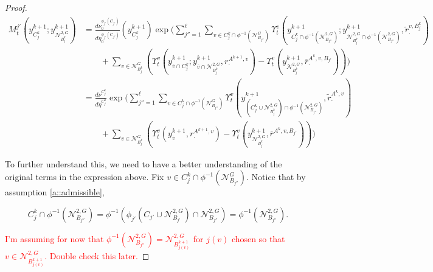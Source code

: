 \documentclass[12pt]{article}
\newcommand{\mc}{\mathcal}
\newcommand{\ov}{\overline}
\newcommand{\tr}{\textcolor{red}}
\newcommand{\gneigh}[2]{\mc{N}^{#1}_{#2}}			%
\newcommand{\dgneigh}[2]{\mc{N}^{2,#1}_{#2}}		%
\newcommand{\cl}[1]{\ov{#1}}						%
\newcommand{\indx}[1]{^{#1}}						%
\newcommand{\rate}{r}								%
\newcommand{\xg}{y}									%
\newcommand{\vind}[1]{_{#1}}						%
\newcommand{\vpara}[1]{^{#1}}						%
\newcommand{\stpara}[1]{_{#1}}						%
\newcommand{\tpara}[1]{_{#1}}						%
\newcommand{\gvpara}[2]{^{#1,#2}}					%
\newcommand{\psize}{\ell}							%
\newcommand{\brate}{\alt{\rate}}					%
\newcommand{\alt}[1]{\tilde{#1}}					%
\newcommand{\mm}{\nu}								%
\newcommand{\bgrate}{\ov{\rate}}					%
\newcommand{\mmm}{\eta}								%
\newcommand{\ds}{\Upsilon}							%
\newcommand{\mdense}{M}								%
\newcommand{\gvjpara}[3]{^{#1,#2,#3}}				%
\newcommand{\jpara}[1]{^{#1}}						%
\newcommand{\vjpara}[2]{^{#1,#2}}					%
\begin{document}
\begin{proof}
\begin{align*}
\mdense\jpara{j'}\tpara{t}\left(\xg\indx{k+1}\vind{C_j\indx{k}};\xg\indx{k+1}\vind{\dgneigh{G}{B\indx{k}_j}}\right) &= \frac{d\mm\vpara{\phi_{j'}(C_{j'})}\tpara{0}}{d\mmm\vpara{\phi_{j'}(C_{j'})}\tpara{0}}(\xg\indx{k+1}\vind{C\indx{k}_j})\exp\Bigg(\sum_{j'' = 1}^{\psize}\sum_{v \in C_j\indx{k}\cap\phi^{-1}(\gneigh{G}{B_{j''}})} \ds\vpara{v}\tpara{t}\left(\xg\indx{k+1}\vind{C_j\indx{k}\cap\phi^{-1}(\dgneigh{G}{B_{j''}})};\xg\indx{k+1}\vind{\dgneigh{G}{B_j\indx{k}}\cap\phi^{-1}(\dgneigh{G}{B_{j''}})},\brate\vjpara{v}{B\indx{k}_j}\stpara{\cdot}\right)\\
&\hspace{24pt} + \sum_{v \in \gneigh{G}{B_j\indx{k}}} \left(\ds\vpara{v}\tpara{t}\left(\xg\indx{k+1}\vind{\cl{v}\cap C_j\indx{k}};\xg\indx{k+1}\vind{\cl{v}\cap\dgneigh{G}{B_j\indx{k}}},\rate\gvpara{A\indx{k+1}}{v}\stpara{\cdot}\right) - \ds\vpara{v}\tpara{t}\left(\xg\indx{k+1}\vind{\dgneigh{G}{B_j\indx{k}}},\bgrate\gvjpara{A\indx{k}}{v}{B_{j'}}\stpara{\cdot}\right)\right)\Bigg)\\
&= \frac{d\mm\vpara{C_j\indx{k}}}{d\mmm\vpara{C_j\indx{k}}}\exp\Bigg(\sum_{j'' =1}^{\psize}\sum_{v \in C_j\indx{k}\cap\phi^{-1}(\gneigh{G}{B_{j''}})} \ds\vpara{v}\tpara{t}\left(\xg\indx{k+1}\vind{\left(C_j\indx{k}\cup\dgneigh{G}{B_j\indx{k}}\right)\cap\phi^{-1}(\dgneigh{G}{B_{j''}})},\brate\gvpara{A\indx{k}}{v}\stpara{\cdot}\right)\\
&\hspace{24pt} + \sum_{v \in \gneigh{G}{B_j\indx{k}}}\left(\ds\vpara{v}\tpara{t}\left(\xg\indx{k+1}\vind{\cl{v}},\rate\gvpara{A\indx{k+1}}{v}\stpara{\cdot}\right) - \ds\vpara{v}\tpara{t}\left(\xg\indx{k+1}\vind{\dgneigh{G}{B_j\indx{k}}},\bgrate\gvjpara{A\indx{k}}{v}{B_{j'}}\right)\right)\Bigg)
\end{align*}

To further understand this, we need to have a better understanding of the original terms in the expression above. Fix \(v \in C_j\indx{k}\cap \phi^{-1}(\gneigh{G}{B_{j''}})\). Notice that by assumption \ref{a::admissible},

\[C_j\indx{k}\cap \phi^{-1}(\dgneigh{G}{B_{j''}}) = \phi^{-1}\left(\phi_{j'}\left(C_{j'}\cup\dgneigh{G}{B_{j'}}\right)\cap \dgneigh{G}{B_{j''}}\right) = \phi^{-1}\left(\dgneigh{G}{B_{j''}}\right).\]

\tr{I'm assuming for now that \(\phi^{-1}(\dgneigh{G}{B_{j''}}) = \dgneigh{G}{B_{j(v)}\indx{k+1}}\) for \(j(v)\) chosen so that \(v \in \dgneigh{G}{B_{j(v)}\indx{k+1}}\). Double check this later.}



\end{proof}
\end{document}
